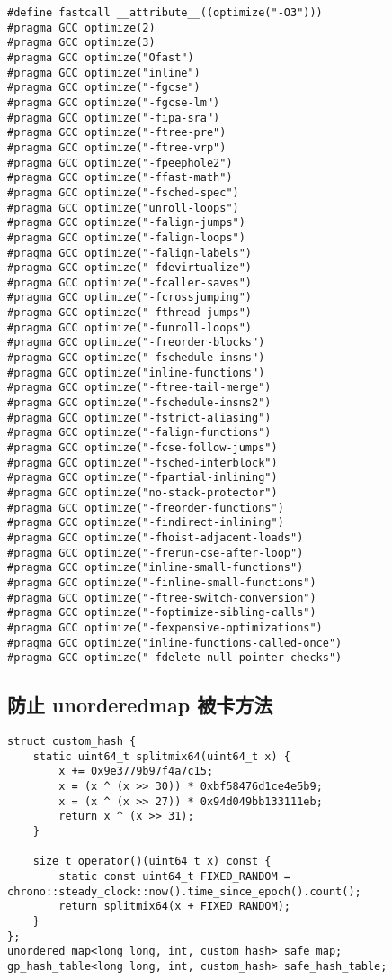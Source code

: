 \documentclass[UTF8]{ctexart}
\begin{document}
\begin{framed}
\begin{lstlisting}
#define fastcall __attribute__((optimize("-O3")))
#pragma GCC optimize(2)
#pragma GCC optimize(3)
#pragma GCC optimize("Ofast")
#pragma GCC optimize("inline")
#pragma GCC optimize("-fgcse")
#pragma GCC optimize("-fgcse-lm")
#pragma GCC optimize("-fipa-sra")
#pragma GCC optimize("-ftree-pre")
#pragma GCC optimize("-ftree-vrp")
#pragma GCC optimize("-fpeephole2")
#pragma GCC optimize("-ffast-math")
#pragma GCC optimize("-fsched-spec")
#pragma GCC optimize("unroll-loops")
#pragma GCC optimize("-falign-jumps")
#pragma GCC optimize("-falign-loops")
#pragma GCC optimize("-falign-labels")
#pragma GCC optimize("-fdevirtualize")
#pragma GCC optimize("-fcaller-saves")
#pragma GCC optimize("-fcrossjumping")
#pragma GCC optimize("-fthread-jumps")
#pragma GCC optimize("-funroll-loops")
#pragma GCC optimize("-freorder-blocks")
#pragma GCC optimize("-fschedule-insns")
#pragma GCC optimize("inline-functions")
#pragma GCC optimize("-ftree-tail-merge")
#pragma GCC optimize("-fschedule-insns2")
#pragma GCC optimize("-fstrict-aliasing")
#pragma GCC optimize("-falign-functions")
#pragma GCC optimize("-fcse-follow-jumps")
#pragma GCC optimize("-fsched-interblock")
#pragma GCC optimize("-fpartial-inlining")
#pragma GCC optimize("no-stack-protector")
#pragma GCC optimize("-freorder-functions")
#pragma GCC optimize("-findirect-inlining")
#pragma GCC optimize("-fhoist-adjacent-loads")
#pragma GCC optimize("-frerun-cse-after-loop")
#pragma GCC optimize("inline-small-functions")
#pragma GCC optimize("-finline-small-functions")
#pragma GCC optimize("-ftree-switch-conversion")
#pragma GCC optimize("-foptimize-sibling-calls")
#pragma GCC optimize("-fexpensive-optimizations")
#pragma GCC optimize("inline-functions-called-once")
#pragma GCC optimize("-fdelete-null-pointer-checks")
\end{lstlisting}
\end{framed}

\subsection{防止 unorderedmap 被卡方法}

\begin{framed}
\begin{lstlisting}
struct custom_hash {
    static uint64_t splitmix64(uint64_t x) {
        x += 0x9e3779b97f4a7c15;
        x = (x ^ (x >> 30)) * 0xbf58476d1ce4e5b9;
        x = (x ^ (x >> 27)) * 0x94d049bb133111eb;
        return x ^ (x >> 31);
    }

    size_t operator()(uint64_t x) const {
        static const uint64_t FIXED_RANDOM = chrono::steady_clock::now().time_since_epoch().count();
        return splitmix64(x + FIXED_RANDOM);
    }
};
unordered_map<long long, int, custom_hash> safe_map;
gp_hash_table<long long, int, custom_hash> safe_hash_table;
\end{lstlisting}
\end{framed}
\end{document}
